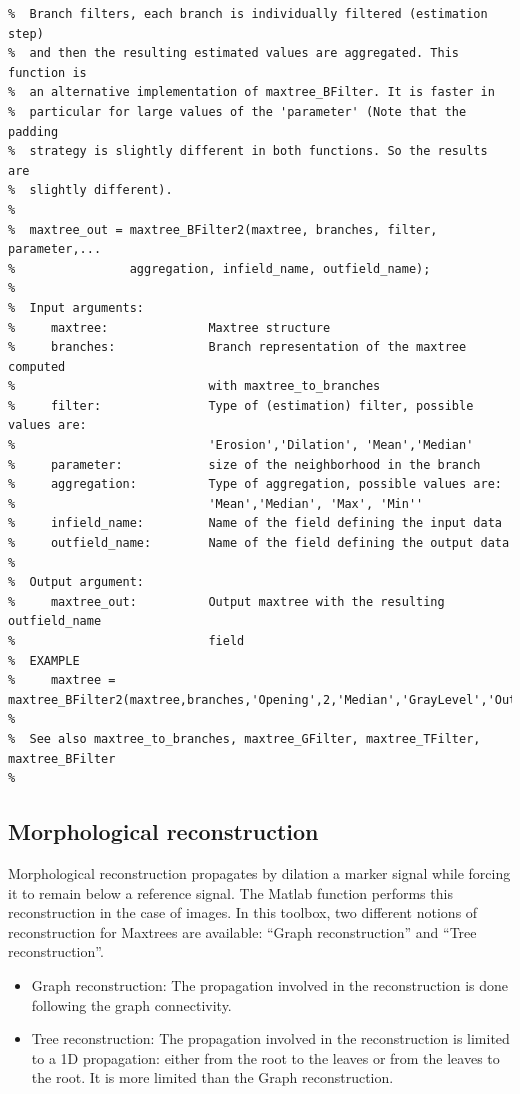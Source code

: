 \documentclass[DIV=calc, paper=a4, fontsize=11pt]{scrartcl}	 %
\begin{document}
\begin{lstlisting}[aboveskip=0.5 \baselineskip]
%  maxtree_BFilter2 computes a Branch Filter on attributes of Maxtrees. In
%  Branch filters, each branch is individually filtered (estimation step)
%  and then the resulting estimated values are aggregated. This function is
%  an alternative implementation of maxtree_BFilter. It is faster in
%  particular for large values of the 'parameter' (Note that the padding
%  strategy is slightly different in both functions. So the results are
%  slightly different). 
% 
%  maxtree_out = maxtree_BFilter2(maxtree, branches, filter, parameter,... 
%                aggregation, infield_name, outfield_name);
%
%  Input arguments:
%     maxtree:              Maxtree structure
%     branches:             Branch representation of the maxtree computed 
%                           with maxtree_to_branches
%     filter:               Type of (estimation) filter, possible values are: 
%                           'Erosion','Dilation', 'Mean','Median'
%     parameter:            size of the neighborhood in the branch
%     aggregation:          Type of aggregation, possible values are:
%                           'Mean','Median', 'Max', 'Min''
%     infield_name:         Name of the field defining the input data
%     outfield_name:        Name of the field defining the output data
%
%  Output argument:
%     maxtree_out:          Output maxtree with the resulting outfield_name
%                           field
%  EXAMPLE 
%     maxtree = maxtree_BFilter2(maxtree,branches,'Opening',2,'Median','GrayLevel','Out');
%
%  See also maxtree_to_branches, maxtree_GFilter, maxtree_TFilter, maxtree_BFilter
%
\end{lstlisting}

\subsection{Morphological reconstruction}
Morphological reconstruction propagates by dilation a marker signal while forcing it to remain below a reference signal. 
The Matlab  function performs this reconstruction in the case of images. In this toolbox, 
two different notions of reconstruction for Maxtrees are available: ``Graph reconstruction'' and ``Tree reconstruction''.
\begin{itemize}
\item Graph reconstruction: The propagation involved in the reconstruction is done following the graph connectivity. 
\item Tree reconstruction: The propagation involved in the reconstruction is limited to a 1D propagation: either from the root to the leaves 
or from the leaves to the root. It is more limited than the Graph reconstruction.  
\end{itemize}
\end{document}
